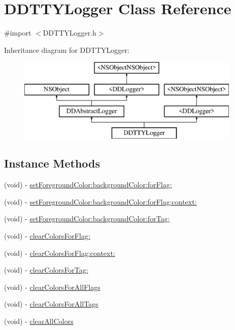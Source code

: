 \hypertarget{interface_d_d_t_t_y_logger}{\section{D\-D\-T\-T\-Y\-Logger Class Reference}
\label{interface_d_d_t_t_y_logger}
}


{\ttfamily \#import $<$D\-D\-T\-T\-Y\-Logger.\-h$>$}

Inheritance diagram for D\-D\-T\-T\-Y\-Logger\-:\begin{figure}[H]
\begin{center}
\leavevmode
\includegraphics[height=4.000000cm]{interface_d_d_t_t_y_logger}
\end{center}
\end{figure}
\subsection*{Instance Methods}
\begin{DoxyCompactItemize}
\item 
(void) -\/ \hyperlink{interface_d_d_t_t_y_logger_a8cc7b90b379c24c16deb915bb66edd2c}{set\-Foreground\-Color\-:background\-Color\-:for\-Flag\-:}
\item 
(void) -\/ \hyperlink{interface_d_d_t_t_y_logger_a027da91f6f5cf24b801a2a30ebdfa7fb}{set\-Foreground\-Color\-:background\-Color\-:for\-Flag\-:context\-:}
\item 
(void) -\/ \hyperlink{interface_d_d_t_t_y_logger_a3bd75b42477758e7e779fae61057584c}{set\-Foreground\-Color\-:background\-Color\-:for\-Tag\-:}
\item 
(void) -\/ \hyperlink{interface_d_d_t_t_y_logger_acf10b74c6b9ab7b5a4fbbec695b743f4}{clear\-Colors\-For\-Flag\-:}
\item 
(void) -\/ \hyperlink{interface_d_d_t_t_y_logger_a1dccacc79bb52b97daf96361052ac882}{clear\-Colors\-For\-Flag\-:context\-:}
\item 
(void) -\/ \hyperlink{interface_d_d_t_t_y_logger_a51e2825041252ae2c4dfb42e6c30b065}{clear\-Colors\-For\-Tag\-:}
\item 
(void) -\/ \hyperlink{interface_d_d_t_t_y_logger_a53437ad5e9d4aa6b4da4471b33252ea7}{clear\-Colors\-For\-All\-Flags}
\item 
(void) -\/ \hyperlink{interface_d_d_t_t_y_logger_ab85aba750ff9fbbb0a070d9ed655e37c}{clear\-Colors\-For\-All\-Tags}
\item 
(void) -\/ \hyperlink{interface_d_d_t_t_y_logger_a4512bc72f873d7f1ad690ae40ca6b9ca}{clear\-All\-Colors}
\end{DoxyCompactItemize}
